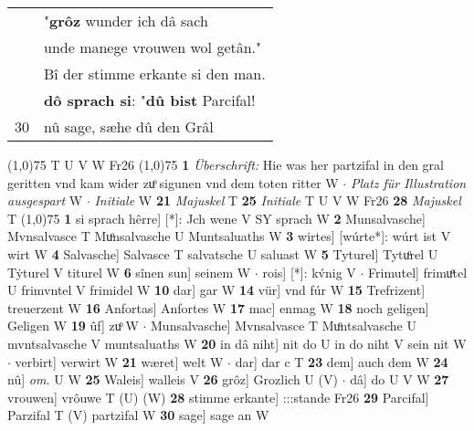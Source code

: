 \documentclass[8pt,a4paper,notitlepage]{article}
\begin{document}
\begin{table}[ht]
\begin{minipage}[t]{0.5\linewidth}
\begin{tabular}{rl}
 & "\textbf{grôz} wunder ich dâ sach\\ 
 & unde manege vrouwen wol getân."\\ 
 & Bî der stimme erkante si den man.\\ 
 & \textbf{dô sprach si}: "\textbf{dû bist} Parcifal!\\ 
30 & nû sage, sæhe dû den Grâl\\ 
\end{tabular}
\scriptsize
\line(1,0){75} \newline
T U V W Fr26 \newline
\line(1,0){75} \newline
\textbf{1} \textit{Überschrift:} Hie was her partzifal in den gral geritten vnd kam wider zuͦ sigunen vnd dem toten ritter W   $\cdot$ \textit{Platz für Illustration ausgespart} W   $\cdot$ \textit{Initiale} W  \textbf{21} \textit{Majuskel} T  \textbf{25} \textit{Initiale} T U V W Fr26  \textbf{28} \textit{Majuskel} T  \newline
\line(1,0){75} \newline
\textbf{1} si sprach hêrre] [*]: Jch wene V SY sprach W \textbf{2} Munsalvasche] Mvnsalvasce T Muͦnsalvasche U Muntsaluaths W \textbf{3} wirtes] [wúrte*]: wúrt ist V wirt W \textbf{4} Salvasche] Salvasce T salvatsche U saluast W \textbf{5} Tyturel] Tytuͦrel U Tẏturel V titurel W \textbf{6} sînen sun] seinem W  $\cdot$ rois] [*]: kv́nig V  $\cdot$ Frimutel] frimuͦtel U frimvntel V frimidel W \textbf{10} dar] gar W \textbf{14} vür] vnd fúr W \textbf{15} Trefrizent] treuerzent W \textbf{16} Anfortas] Anfortes W \textbf{17} mac] enmag W \textbf{18} noch geligen] Geligen W \textbf{19} ûf] zuͦ W  $\cdot$ Munsalvasche] Mvnsalvasce T Muͦntsalvasche U mvntsalvasche V muntsaluaths W \textbf{20} in dâ niht] nit do U in do niht V sein nit W  $\cdot$ verbirt] verwirt W \textbf{21} wæret] welt W  $\cdot$ dar] dar c T \textbf{23} dem] auch dem W \textbf{24} nû] \textit{om.} U W \textbf{25} Waleis] walleis V \textbf{26} grôz] Grozlich U (V)  $\cdot$ dâ] do U V W \textbf{27} vrouwen] vrôuwe T (U) (W) \textbf{28} stimme erkante] :::stande Fr26 \textbf{29} Parcifal] Parzifal T (V) partzifal W \textbf{30} sage] sage an W \newline
\end{minipage}
\end{table}
\end{document}
